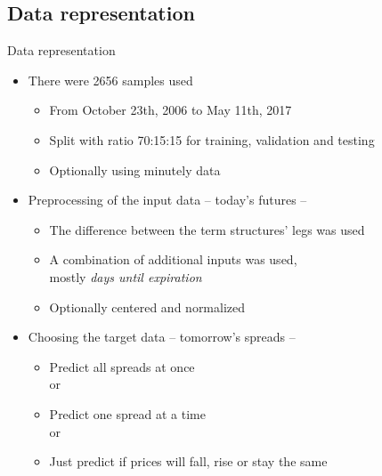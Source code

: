 \documentclass{beamer}
\begin{document}
\subsection{Data representation}
\begin{frame}{Data representation}
	\begin{itemize}
		\item<1-> There were \alert{2656 samples} used
			\begin{itemize}
				\item From October 23th, 2006 to May 11th, 2017
				\item Split with ratio 70:15:15 for training, validation and testing
				\item Optionally using minutely data
			\end{itemize}
		\item<2-> Preprocessing of the \alert{input data} -- today's futures --
			\begin{itemize}
				\item The difference between the term structures' legs was used
				\item A combination of additional inputs was used, \\ mostly \emph{days until expiration}
				\item Optionally centered and normalized
			\end{itemize}
		\item<3-> Choosing the \alert{target data} -- tomorrow's spreads --
			\begin{itemize}
				\item Predict all spreads at once \\
				or
				\item Predict one spread at a time \\
				or
				\item Just predict if prices will fall, rise or stay the same
			\end{itemize}
	\end{itemize}
\end{frame}
\end{document}
